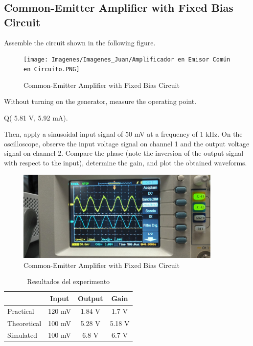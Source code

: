 \subsection{Common-Emitter Amplifier with Fixed Bias Circuit}
Assemble the circuit shown in the following figure.
\begin{figure}[H]
    \centering
    \texttt{[image: Imagenes/Imagenes\_Juan/Amplificador en Emisor Común en Circuito.PNG]}
    \caption{Common-Emitter Amplifier with Fixed Bias Circuit}
    \label{circuit1}
\end{figure}

Without turning on the generator, measure the operating point.

\begin{center}
    Q( 5.81 V, 5.92 mA).
\end{center}


Then, apply a sinusoidal input signal of 50 mV at a frequency of 1 kHz.
On the oscilloscope, observe the input voltage signal on channel 1 and the output voltage signal on channel 
2. Compare the phase (note the inversion of the output signal with respect to the input), determine the 
gain, and plot the obtained waveforms.

\begin{figure}[H]
    \centering
    \includegraphics[width = 0.9\textwidth]{Imagenes/Imagenes_Juan/Osciloscopio Circuito 1.jpg}
    \caption{Common-Emitter Amplifier with Fixed Bias Circuit}
    \label{circuit1Osciloscopio}
\end{figure}

\begin{table}[H]
\centering
\caption{Resultados del experimento}
\label{tab:resultados}
\begin{tabular}{lccc} %
\toprule
 & Input & Output & Gain \\ 
\midrule
Practical   & 120 mV & 1.84 V & 1.7 V\\ 
Theoretical & 100 mV & 5.28 V & 5.18 V\\ 
Simulated   & 100 mV & 6.8 V & 6.7 V \\ 
\bottomrule
\end{tabular}
\end{table}



